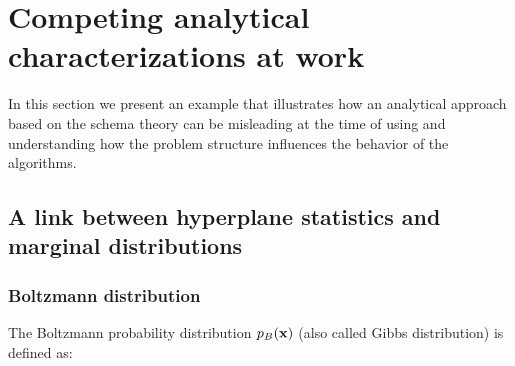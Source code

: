 \documentclass{article} %
\begin{document}
  
%


 \section{Competing  analytical characterizations at work}   \label{sec:GRAPHS}
 
  In this section we present an example that illustrates how an analytical approach based on the schema theory can be misleading at the time of using and understanding how the problem structure influences the behavior of the algorithms. 

\subsection{A link between hyperplane statistics and marginal distributions}


\subsubsection{Boltzmann distribution}

 The Boltzmann probability distribution  $p_B({\bf{x}})$ (also called Gibbs distribution) is defined as:  
\end{document}
